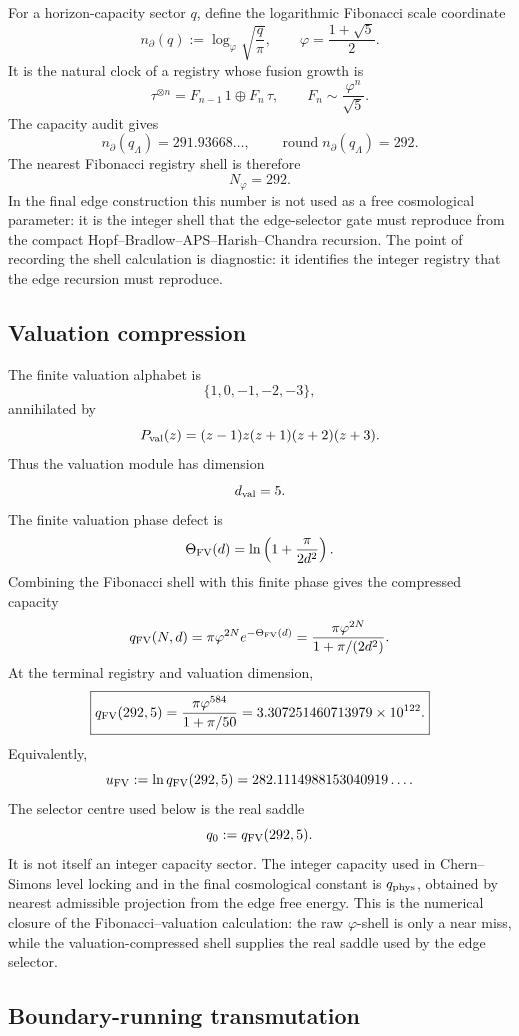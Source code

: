 \documentclass[aps,prd,reprint,nofootinbib,superscriptaddress,floatfix]{revtex4-2}
\numberwithin{equation}{section}
\theoremstyle{definition}
\theoremstyle{plain}
\begin{document}
For a horizon-capacity sector \(q\), define the logarithmic Fibonacci scale
coordinate
\[
n_\partial(q):=\log_\varphi\sqrt{\frac{q}{\pi}},
\qquad
\varphi=\frac{1+\sqrt5}{2}.
\]
It is the natural clock of a registry whose fusion growth is
\[
\tau^{\otimes n}=F_{n-1}\,1\oplus F_n\,\tau,
\qquad
F_n\sim \frac{\varphi^n}{\sqrt5}.
\]
The capacity audit gives
\[
n_\partial(q_\Lambda)=291.93668\ldots,
\qquad
\operatorname{round}n_\partial(q_\Lambda)=292.
\]
The nearest Fibonacci registry shell is therefore
\[
\boxed{N_\varphi=292.}
\]
In the final edge construction this number is not used as a free
cosmological parameter: it is the integer shell that the edge-selector gate must reproduce from the
compact Hopf--Bradlow--APS--Harish--Chandra recursion.  The point of recording
the shell calculation is diagnostic: it identifies the integer registry that the
edge recursion must reproduce.

\subsection{Valuation compression}

The finite valuation alphabet is
\[
\{1,0,-1,-2,-3\},
\]
annihilated by
\[
P_{\rm val}(z)=(z-1)z(z+1)(z+2)(z+3).
\]
Thus the valuation module has dimension
\[
d_{\rm val}=5.
\]
The finite valuation phase defect is
\[
\Theta_{\rm FV}(d)=\ln\left(1+\frac{\pi}{2d^2}\right).
\]
Combining the Fibonacci shell with this finite phase gives the compressed
capacity
\[
q_{\rm FV}(N,d)
=
\pi\varphi^{2N}e^{-\Theta_{\rm FV}(d)}
=
\frac{\pi\varphi^{2N}}{1+\pi/(2d^2)}.
\]
At the terminal registry and valuation dimension,
\[
\boxed{
q_{\rm FV}(292,5)
=
\frac{\pi\varphi^{584}}{1+\pi/50}
=
3.307251460713979\times10^{122}.
}
\]
Equivalently,
\[
u_{\rm FV}:=\ln q_{\rm FV}(292,5)
=
282.1114988153040919\ldots .
\]
The selector centre used below is the real saddle
\[
q_0:=q_{\rm FV}(292,5).
\]
It is not itself an integer capacity sector.  The integer capacity used in
Chern--Simons level locking and in the final cosmological constant is
\(q_{\rm phys}\), obtained by nearest admissible projection from the edge free
energy.
This is the numerical closure of the Fibonacci--valuation calculation:
the raw \(\varphi\)-shell is only a near miss, while the valuation-compressed
shell supplies the real saddle used by the edge selector.

\subsection{Boundary-running transmutation}
\end{document}
